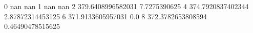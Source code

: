 0 nan nan
1 nan nan
2 379.6408996582031 7.7275390625
4 374.7920837402344 2.87872314453125
6 371.9133605957031 0.0
8 372.3782653808594 0.46490478515625
